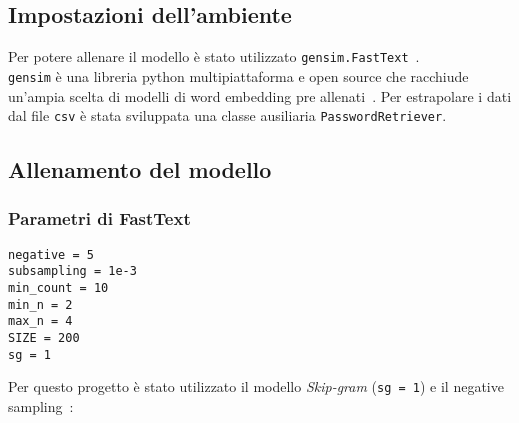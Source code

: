 \subsection{Impostazioni dell'ambiente}
Per potere allenare il modello è stato utilizzato \texttt{gensim.FastText}~\cite{gensim}.
\\
\texttt{gensim} è una libreria python multipiattaforma e open source che racchiude un'ampia scelta di modelli di word embedding pre allenati~\cite{gensim}.
Per estrapolare i dati dal file \texttt{csv} è stata sviluppata una classe ausiliaria \texttt{PasswordRetriever}.
\subsection{Allenamento del modello}
\subsubsection{Parametri di FastText}
\begin{verbatim}
negative = 5
subsampling = 1e-3
min_count = 10
min_n = 2
max_n = 4
SIZE = 200
sg = 1
\end{verbatim}
Per questo progetto è stato utilizzato il modello \emph{Skip-gram} (\texttt{sg = 1}) e il negative sampling~\cite{negative}:
